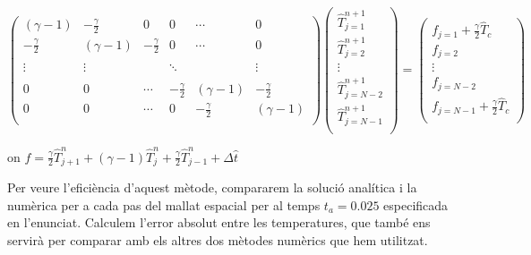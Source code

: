 \documentclass[11pt]{article}
\begin{document}
\begin{equation}
  \begin{pmatrix}
    (\gamma - {1}) & {-}\frac{\gamma}{2} & {0} & {0} & \cdots & {0} \\
    {-}\frac{\gamma}{2} & (\gamma - {1}) & {-}\frac{\gamma}{2} & {0} & \cdots & {0} \\
    & \\
    \vdots & \vdots & & \ddots & & \vdots \\
    & \\
    {0} & {0} & \cdots & {-}\frac{\gamma}{2} & (\gamma - {1}) & {-}\frac{\gamma}{2} \\
    {0} & {0} & \cdots & {0} & {-}\frac{\gamma}{2} & (\gamma - {1}) \\
    \end{pmatrix}
    \begin{pmatrix}
        \hat{T}_{j=1}^{n+1} \\
        \hat{T}_{j=2}^{n+1} \\
        \vdots \\
        \hat{T}_{j=N-2}^{n+1} \\
        \hat{T}_{j=N-1}^{n+1} \\
    \end{pmatrix}
    =
    \begin{pmatrix}
        f_{j=1} +\frac{\gamma}{2}\hat{T}_{c} \\
        f_{j=2} \\
        \vdots \\
        f_{j=N-2} \\
        f_{j=N-1} +\frac{\gamma}{2}\hat{T}_{c} \\
    \end{pmatrix}
\end{equation}

\begin{center}
on $f = \frac{\gamma}{2}\hat{T}_{j+1}^{n} + (\gamma - {1})\hat{T}_{j}^{n} + \frac{\gamma}{2}\hat{T}_{j-1}^{n} + \Delta\hat{t}$
\end{center}

Per veure l'eficiència d'aquest mètode, compararem la solució analítica i la numèrica per a cada pas del 
mallat espacial per al temps $t_a = 0.025$ especificada en l'enunciat. Calculem l'error absolut entre les 
temperatures, que també ens servirà per comparar amb els altres dos mètodes numèrics que hem utilitzat.
\end{document}
